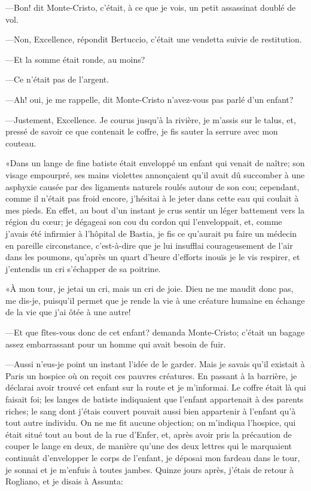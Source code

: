 —Bon! dit Monte-Cristo, c'était, à ce que je vois, un petit assassinat doublé de vol. 

—Non, Excellence, répondit Bertuccio, c'était une vendetta suivie de restitution. 

—Et la somme était ronde, au moins? 

—Ce n'était pas de l'argent. 

—Ah! oui, je me rappelle, dit Monte-Cristo n'avez-vous pas parlé d'un enfant? 

—Justement, Excellence. Je courus jusqu'à la rivière, je m'assis sur le talus, et, pressé de savoir ce que contenait le coffre, je fis sauter la serrure avec mon couteau. 

«Dans un lange de fine batiste était enveloppé un enfant qui venait de naître; son visage empourpré, ses mains violettes annonçaient qu'il avait dû succomber à une asphyxie causée par des ligaments naturels roulés autour de son cou; cependant, comme il n'était pas froid encore, j'hésitai à le jeter dans cette eau qui coulait à mes pieds. En effet, au bout d'un instant je crus sentir un léger battement vers la région du cœur; je dégageai son cou du cordon qui l'enveloppait, et, comme j'avais été infirmier à l'hôpital de Bastia, je fis ce qu'aurait pu faire un médecin en pareille circonstance, c'est-à-dire que je lui insufflai courageusement de l'air dans les poumons, qu'après un quart d'heure d'efforts inouïs je le vis respirer, et j'entendis un cri s'échapper de sa poitrine. 

«À mon tour, je jetai un cri, mais un cri de joie. Dieu ne me maudit donc pas, me dis-je, puisqu'il permet que je rende la vie à une créature humaine en échange de la vie que j'ai ôtée à une autre! 

—Et que fîtes-vous donc de cet enfant? demanda Monte-Cristo; c'était un bagage assez embarrassant pour un homme qui avait besoin de fuir. 

—Aussi n'eus-je point un instant l'idée de le garder. Mais je savais qu'il existait à Paris un hospice où on reçoit ces pauvres créatures. En passant à la barrière, je déclarai avoir trouvé cet enfant sur la route et je m'informai. Le coffre était là qui faisait foi; les langes de batiste indiquaient que l'enfant appartenait à des parents riches; le sang dont j'étais couvert pouvait aussi bien appartenir à l'enfant qu'à tout autre individu. On ne me fit aucune objection; on m'indiqua l'hospice, qui était situé tout au bout de la rue d'Enfer, et, après avoir pris la précaution de couper le lange en deux, de manière qu'une des deux lettres qui le marquaient continuât d'envelopper le corps de l'enfant, je déposai mon fardeau dans le tour, je sonnai et je m'enfuis à toutes jambes. Quinze jours après, j'étais de retour à Rogliano, et je disais à Assunta: 

